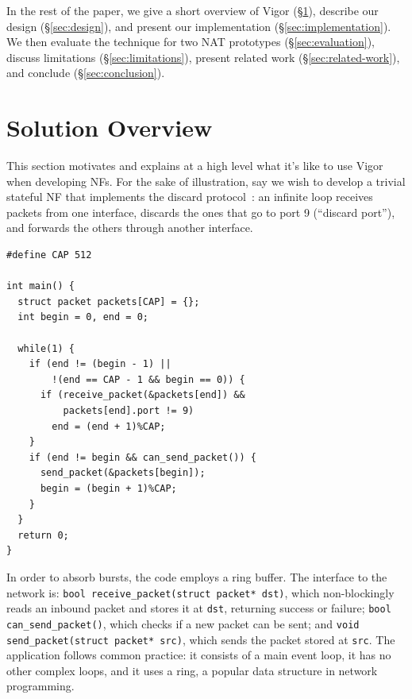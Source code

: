 \documentclass[letterpaper,twocolumn,10pt]{article}
\newcommand{\code}[1]{\lstinline{#1}}
\begin{document}
In the rest of the paper, we give a short overview of Vigor (\S\ref{sec:solution-overview}), describe our design (\S\ref{sec:design}), and present our implementation (\S\ref{sec:implementation}). We then evaluate the technique for two NAT prototypes (\S\ref{sec:evaluation}), discuss limitations (\S\ref{sec:limitations}), present related work (\S\ref{sec:related-work}), and conclude (\S\ref{sec:conclusion}).


\section{Solution Overview}
\label{sec:solution-overview}

This section motivates and explains at a high level what it's like to use Vigor when developing NFs. For the sake of illustration, say we wish to develop a trivial stateful NF that implements the discard protocol~\cite{rfc863}: an infinite loop receives packets from one interface, discards the ones that go to port 9 (``discard port''), and forwards the others through another interface.

\begin{lstlisting}
#define CAP 512

int main() {
  struct packet packets[CAP] = {};
  int begin = 0, end = 0;

  while(1) {
    if (end != (begin - 1) || 
        !(end == CAP - 1 && begin == 0)) {
      if (receive_packet(&packets[end]) && 
          packets[end].port != 9)
        end = (end + 1)%CAP;
    }
    if (end != begin && can_send_packet()) {
      send_packet(&packets[begin]);
      begin = (begin + 1)%CAP;
    }
  }
  return 0;
}

\end{lstlisting}

In order to absorb bursts, the code employs a ring buffer. The interface to the
network is: \code{bool receive_packet(struct packet* dst)}, which
non-blockingly reads an inbound packet and stores it at \code{dst}, returning success or failure; \code{bool can_send_packet()}, which checks if a new packet can be sent; and \code{void send_packet(struct packet* src)}, which sends the packet stored at \code{src}. The application follows common practice: it consists of a main event loop, it has no other complex loops, and it uses a ring, a popular data structure in network programming.
\end{document}
